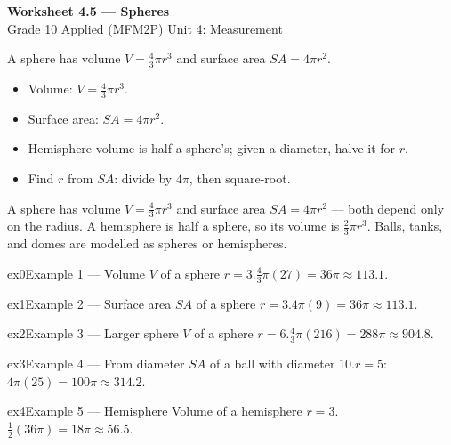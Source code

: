 \documentclass[11pt]{article}
\begin{document}
\begin{center}
{\LARGE\bfseries\color{titleblue}Worksheet 4.5 --- Spheres}\\[2pt]
{\small Grade 10 Applied (MFM2P) \textperiodcentered{} Unit 4: Measurement}
\end{center}

\begin{ideabox}
A sphere has volume $V=\tfrac43\pi r^3$ and surface area $SA=4\pi r^2$.
\begin{itemize}[leftmargin=*,itemsep=2pt]
  \item Volume: $V=\tfrac43\pi r^3$.
  \item Surface area: $SA=4\pi r^2$.
  \item Hemisphere volume is half a sphere's; given a diameter, halve it for $r$.
  \item Find $r$ from $SA$: divide by $4\pi$, then square-root.
\end{itemize}
\end{ideabox}

\begin{learnbox}
A sphere has volume $V=\tfrac43\pi r^3$ and surface area $SA=4\pi r^2$ — both depend only on the radius.
A hemisphere is half a sphere, so its volume is $\tfrac23\pi r^3$.
Balls, tanks, and domes are modelled as spheres or hemispheres.
\end{learnbox}


\begin{example}{ex0}{Example 1 --- Volume}
$V$ of a sphere $r=3$.\soln $\tfrac43\pi(27)=36\pi\approx113.1$.
\end{example}

\begin{example}{ex1}{Example 2 --- Surface area}
$SA$ of a sphere $r=3$.\soln $4\pi(9)=36\pi\approx113.1$.
\end{example}

\begin{example}{ex2}{Example 3 --- Larger sphere}
$V$ of a sphere $r=6$.\soln $\tfrac43\pi(216)=288\pi\approx904.8$.
\end{example}

\begin{example}{ex3}{Example 4 --- From diameter}
$SA$ of a ball with diameter $10$.\soln $r=5$: $4\pi(25)=100\pi\approx314.2$.
\end{example}

\begin{example}{ex4}{Example 5 --- Hemisphere}
Volume of a hemisphere $r=3$.\soln $\tfrac12(36\pi)=18\pi\approx56.5$.
\end{example}
\end{document}
